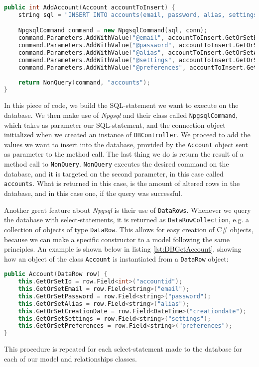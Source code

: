 \begin{lstlisting}[language=c++, caption=Adding a new Account to the Database, label={lst:DBAddAccount}]
public int AddAccount(Account accountToInsert) {
	string sql = "INSERT INTO accounts(email, password, alias, settings, preferences) VALUES (@email, @password, @alias, @settings, @preferences)";

	NpgsqlCommand command = new NpgsqlCommand(sql, conn);
	command.Parameters.AddWithValue("@email", accountToInsert.GetOrSetEmail);
	command.Parameters.AddWithValue("@password", accountToInsert.GetOrSetPassword);
	command.Parameters.AddWithValue("@alias", accountToInsert.GetOrSetAlias);
	command.Parameters.AddWithValue("@settings", accountToInsert.GetOrSetSettings);
	command.Parameters.AddWithValue("@preferences", accountToInsert.GetOrSetPreferences);
	
	return NonQuery(command, "accounts");
}
\end{lstlisting}

In this piece of code, we build the SQL-statement we want to execute on the database. We then make use of \textit{Npgsql} and their class called \texttt{NpgsqlCommand}, which takes as parameter our SQL-statement, and the connection object initialized when we created an instance of \texttt{DBController}. We proceed to add the values we want to insert into the database, provided by the \texttt{Account} object sent as parameter to the method call. The last thing we do is return the result of a method call to \texttt{NonQuery}. \texttt{NonQuery} executes the desired command on the database, and it is targeted on the second parameter, in this case called \texttt{accounts}. What is returned in this case, is the amount of altered rows in the database, and in this case one, if the query was successful.

Another great feature about \textit{Npgsql} is their use of \texttt{DataRows}\cite{datarow}. Whenever we query the database with select-statements, it is returned as \texttt{DataRowCollection}, e.g. a collection of objects of type \texttt{DataRow}. This allows for easy creation of C\# objects, because we can make a specific constructor to a model following the same principles. An example is shown below in listing \ref{lst:DBGetAccount}, showing how an object of the class \texttt{Account} is instantiated from a \texttt{DataRow} object:

\begin{lstlisting}[language=c++, caption=Instantiating a new Account-object from a DataRow-object, label={lst:DBGetAccount}]
public Account(DataRow row) {
	this.GetOrSetId = row.Field<int>("accountid");
	this.GetOrSetEmail = row.Field<string>("email");
	this.GetOrSetPassword = row.Field<string>("password");
	this.GetOrSetAlias = row.Field<string>("alias");
	this.GetOrSetCreationDate = row.Field<DateTime>("creationdate");
	this.GetOrSetSettings = row.Field<string>("settings");
	this.GetOrSetPreferences = row.Field<string>("preferences");
}
\end{lstlisting}

This procedure is repeated for each select-statement made to the database for each of our model and relationships classes.

